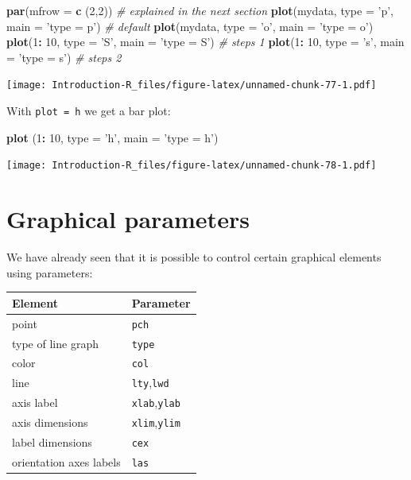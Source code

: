 \documentclass[]{book}
\newenvironment{Shaded}{\begin{snugshade}}{\end{snugshade}}
\newcommand{\CommentTok}[1]{\textcolor[rgb]{0.56,0.35,0.01}{\textit{#1}}}
\newcommand{\DataTypeTok}[1]{\textcolor[rgb]{0.13,0.29,0.53}{#1}}
\newcommand{\DecValTok}[1]{\textcolor[rgb]{0.00,0.00,0.81}{#1}}
\newcommand{\KeywordTok}[1]{\textcolor[rgb]{0.13,0.29,0.53}{\textbf{#1}}}
\newcommand{\NormalTok}[1]{#1}
\newcommand{\OperatorTok}[1]{\textcolor[rgb]{0.81,0.36,0.00}{\textbf{#1}}}
\newcommand{\StringTok}[1]{\textcolor[rgb]{0.31,0.60,0.02}{#1}}
\begin{document}
\begin{Shaded}
\begin{Highlighting}[]
\KeywordTok{par}\NormalTok{(}\DataTypeTok{mfrow =} \KeywordTok{c}\NormalTok{ (}\DecValTok{2}\NormalTok{,}\DecValTok{2}\NormalTok{)) }\CommentTok{# explained in the next section}
\KeywordTok{plot}\NormalTok{(mydata, }\DataTypeTok{type =} \StringTok{'p'}\NormalTok{, }\DataTypeTok{main =} \StringTok{'type = p'}\NormalTok{) }\CommentTok{# default}
\KeywordTok{plot}\NormalTok{(mydata, }\DataTypeTok{type =} \StringTok{'o'}\NormalTok{, }\DataTypeTok{main =} \StringTok{'type = o'}\NormalTok{)}
\KeywordTok{plot}\NormalTok{(}\DecValTok{1}\OperatorTok{:}\StringTok{ }\DecValTok{10}\NormalTok{, }\DataTypeTok{type =} \StringTok{'S'}\NormalTok{, }\DataTypeTok{main =} \StringTok{'type = S'}\NormalTok{) }\CommentTok{# steps 1}
\KeywordTok{plot}\NormalTok{(}\DecValTok{1}\OperatorTok{:}\StringTok{ }\DecValTok{10}\NormalTok{, }\DataTypeTok{type =} \StringTok{'s'}\NormalTok{, }\DataTypeTok{main =} \StringTok{'type = s'}\NormalTok{) }\CommentTok{# steps 2}
\end{Highlighting}
\end{Shaded}

\texttt{[image: Introduction-R\_files/figure-latex/unnamed-chunk-77-1.pdf]}

With \texttt{plot\ =\ \textquotesingle{}h\textquotesingle{}} we get a bar plot:

\begin{Shaded}
\begin{Highlighting}[]
\KeywordTok{plot}\NormalTok{ (}\DecValTok{1}\OperatorTok{:}\StringTok{ }\DecValTok{10}\NormalTok{, }\DataTypeTok{type =} \StringTok{'h'}\NormalTok{, }\DataTypeTok{main =} \StringTok{'type = h'}\NormalTok{)}
\end{Highlighting}
\end{Shaded}

\texttt{[image: Introduction-R\_files/figure-latex/unnamed-chunk-78-1.pdf]}

\hypertarget{graphical-parameters}{%
\section{Graphical parameters}\label{graphical-parameters}}

We have already seen that it is possible to control certain graphical elements using parameters:

\begin{longtable}[]{@{}ll@{}}
\toprule
Element & Parameter\tabularnewline
\midrule
\endhead
point & \texttt{pch}\tabularnewline
type of line graph & \texttt{type}\tabularnewline
color & \texttt{col}\tabularnewline
line & \texttt{lty},\texttt{lwd}\tabularnewline
axis label & \texttt{xlab},\texttt{ylab}\tabularnewline
axis dimensions & \texttt{xlim},\texttt{ylim}\tabularnewline
label dimensions & \texttt{cex}\tabularnewline
orientation axes labels & \texttt{las}\tabularnewline
\bottomrule
\end{longtable}
\end{document}
